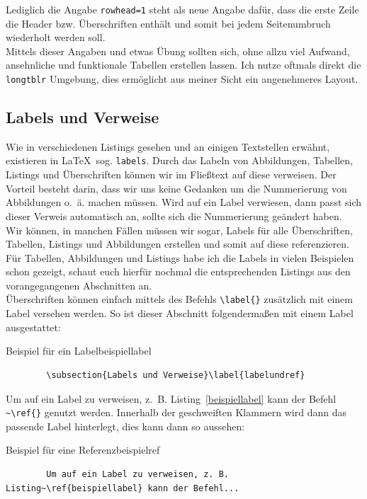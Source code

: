 Lediglich die Angabe \texttt{rowhead=1} steht als neue Angabe dafür, dass die
erste Zeile die Header bzw. Überschriften enthält und somit bei jedem
Seitenumbruch wiederholt werden soll.\\ Mittels dieser Angaben und etwas Übung
sollten sich, ohne allzu viel Aufwand, ansehnliche und funktionale Tabellen
erstellen lassen. Ich nutze oftmals direkt die \texttt{longtblr} Umgebung, dies
ermöglicht aus meiner Sicht ein angenehmeres Layout.

\subsection{Labels und Verweise}\label{labelundref}

Wie in verschiedenen Listings gesehen und an einigen Textstellen erwähnt,
existieren in \LaTeX~sog. \texttt{labels}. Durch das Labeln von Abbildungen,
Tabellen, Listings und Überschriften können wir im Fließtext auf diese
verweisen. Der Vorteil besteht darin, dass wir uns keine Gedanken um die
Nummerierung von Abbildungen o. ä. machen müssen.  Wird auf ein Label verwiesen,
dann passt sich dieser Verweis automatisch an, sollte sich die Nummerierung
geändert haben.\\
Wir können, in manchen Fällen müssen wir sogar, Labels für alle Überschriften,
Tabellen, Listings und Abbildungen erstellen und somit auf diese referenzieren.
Für Tabellen, Abbildungen und Listings habe ich die Labels in vielen Beispielen schon
gezeigt, schaut euch hierfür nochmal die entsprechenden Listings aus den vorangegangenen Abschnitten an.\\
Überschriften können einfach mittels des Befehls \texttt{\textbackslash label\{\}} zusätzlich mit einem Label versehen werden.
So ist dieser Abschnitt folgendermaßen mit einem Label ausgestattet:

\begin{code}{Beispiel für ein Label}{beispiellabel}
	\begin{verbatim}
		\subsection{Labels und Verweise}\label{labelundref}	
	\end{verbatim}
\end{code}

Um auf ein Label zu verweisen, z. B. Listing~\ref{beispiellabel} kann der Befehl
\texttt{\textasciitilde\textbackslash ref\{\}} genutzt werden.
Innerhalb der geschweiften Klammern wird dann das passende Label hinterlegt, dies kann dann so aussehen:

\begin{code}{Beispiel für eine Referenz}{beispielref}
	\begin{verbatim}
		Um auf ein Label zu verweisen, z. B. Listing~\ref{beispiellabel} kann der Befehl...	
	\end{verbatim}
\end{code}

